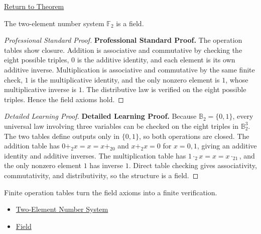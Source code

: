 \newpage
{}
\label{prf:two-element-system-is-field}

\begin{remark*}[Return]
\hyperref[thm:two-element-system-is-field]{Return to Theorem}
\end{remark*}

\begin{theorem*}
The two-element number system \(\mathbb{F}_2\) is a field.
\end{theorem*}

\begin{proof}[Professional Standard Proof]
\LRAProofBodyStart
\textbf{Professional Standard Proof.}
The operation tables show closure. Addition is associative and commutative by
checking the eight possible triples, \(0\) is the additive identity, and each
element is its own additive inverse. Multiplication is associative and
commutative by the same finite check, \(1\) is the multiplicative identity,
and the only nonzero element is \(1\), whose multiplicative inverse is \(1\).
The distributive law is verified on the eight possible triples. Hence the
field axioms hold.
\end{proof}

\begin{proof}[Detailed Learning Proof]
\LRAProofBodyStart
\textbf{Detailed Learning Proof.}
Because \(\mathbb{B}_2=\{0,1\}\), every universal law involving three
variables can be checked on the eight triples in \(\mathbb{B}_2^3\). The two
tables define outputs only in \(\{0,1\}\), so both operations are closed.
The addition table has \(0+_2x=x=x+_20\) and
\(x+_2x=0\) for \(x=0,1\), giving an additive identity and additive inverses.
The multiplication table has \(1\cdot_2x=x=x\cdot_21\), and the only nonzero
element \(1\) has inverse \(1\). Direct table checking gives associativity,
commutativity, and distributivity, so the structure is a field.
\end{proof}

\begin{remark*}
Finite operation tables turn the field axioms into a finite verification.
\end{remark*}

\begin{dependencies}
\begin{itemize}
  \item \hyperref[def:two-element-number-system]{Two-Element Number System}
  \item \hyperref[def:abstract-field]{Field}
\end{itemize}
\end{dependencies}

\clearpage

